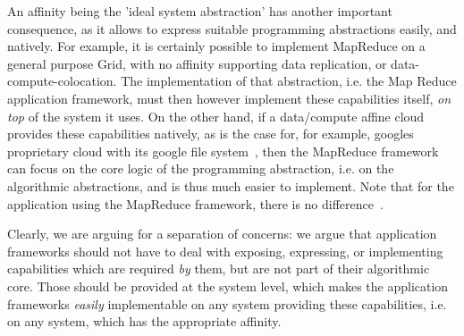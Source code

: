 \documentclass{article}
\newcommand{\I}[1]{\textit{#1}}
\begin{document}

  An affinity being the 'ideal system abstraction' has another
  important consequence, as it allows to express suitable programming
  abstractions easily, and natively.  For example, it is certainly
  possible to implement MapReduce on a general purpose Grid, with no
  affinity supporting data replication, or data-compute-colocation.
  The implementation of that abstraction, i.e. the Map Reduce
  application framework, must then however implement these
  capabilities itself, \I{on top} of the system it uses.  On the other hand, if a
  data/compute affine cloud provides these capabilities natively, as
  is the case for, for example, googles proprietary cloud with its google file
  system~\cite{gfs}, then the MapReduce framework can focus on the
  core logic of the programming abstraction, i.e. on the algorithmic
  abstractions, and is thus much easier to implement.
  Note that for the application using the MapReduce framework, there
  is no difference~\cite{gsoc-saga}.

  Clearly, we are arguing for a separation of concerns: we argue that
  application frameworks should not have to deal with exposing,
  expressing, or implementing capabilities which are required \I{by}
  them, but are not part of their algorithmic core.  Those should be
  provided at the system level, which makes the application frameworks
  \I{easily} implementable on any system providing these capabilities,
  i.e. on any system, which has the appropriate affinity.
\end{document}
